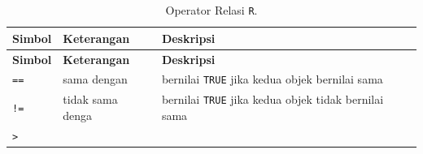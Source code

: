 \documentclass[12pt,]{krantz}
\begin{document}
\begin{longtable}[]{@{}lll@{}}
\caption{\label{tab:oprelasi} Operator Relasi \texttt{R}.}\tabularnewline
\toprule
\begin{minipage}[b]{0.11\columnwidth}\raggedright
\textbf{Simbol}\strut
\end{minipage} & \begin{minipage}[b]{0.17\columnwidth}\raggedright
\textbf{Keterangan}\strut
\end{minipage} & \begin{minipage}[b]{0.64\columnwidth}\raggedright
\textbf{Deskripsi}\strut
\end{minipage}\tabularnewline
\midrule
\endfirsthead
\toprule
\begin{minipage}[b]{0.11\columnwidth}\raggedright
\textbf{Simbol}\strut
\end{minipage} & \begin{minipage}[b]{0.17\columnwidth}\raggedright
\textbf{Keterangan}\strut
\end{minipage} & \begin{minipage}[b]{0.64\columnwidth}\raggedright
\textbf{Deskripsi}\strut
\end{minipage}\tabularnewline
\midrule
\endhead
\begin{minipage}[t]{0.11\columnwidth}\raggedright
\texttt{==}\strut
\end{minipage} & \begin{minipage}[t]{0.17\columnwidth}\raggedright
sama dengan\strut
\end{minipage} & \begin{minipage}[t]{0.64\columnwidth}\raggedright
bernilai \texttt{TRUE} jika kedua objek bernilai sama\strut
\end{minipage}\tabularnewline
\begin{minipage}[t]{0.11\columnwidth}\raggedright
\texttt{!=}\strut
\end{minipage} & \begin{minipage}[t]{0.17\columnwidth}\raggedright
tidak sama denga\strut
\end{minipage} & \begin{minipage}[t]{0.64\columnwidth}\raggedright
bernilai \texttt{TRUE} jika kedua objek tidak bernilai sama\strut
\end{minipage}\tabularnewline
\begin{minipage}[t]{0.11\columnwidth}\raggedright
\texttt{\textgreater{}}\strut
\end{minipage} & \begin{minipage}[t]{0.17\columnwidth}\raggedright

\end{minipage}
\end{longtable}
\end{document}
